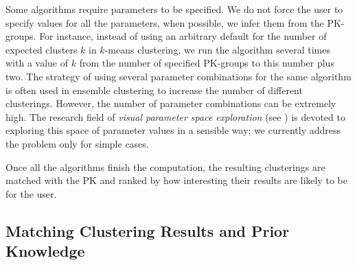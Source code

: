 Some algorithms require parameters to be specified. We do not force the user to specify values for all the parameters, when possible, we infer them from the PK-groups. For instance, instead of using an arbitrary default for the number of expected clusters $k$ in $k$-means clustering, we run the algorithm several times with a value of $k$ from the number of specified PK-groups to this number plus two.
%
The strategy of using several parameter combinations for the same algorithm is often used in ensemble clustering to increase the number of different clusterings.
However, the number of parameter combinations can be extremely high. The research field of \emph{visual parameter space exploration} (see \eg \cite{sedlmairVisualParameterSpace2014}) is devoted to exploring this space of parameter values in a sensible way; we currently address the problem only for simple cases.



Once all the algorithms finish the computation, the resulting clusterings are matched with the PK and ranked by how interesting their results are likely to be for the user.


\subsection{Matching Clustering Results and Prior Knowledge}
\label{sec:matching}

